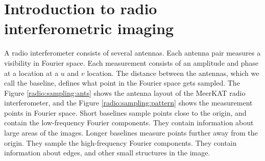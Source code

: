 \section{Introduction to radio interferometric imaging}\label{radio}

A radio interferometer consists of several antennas. Each antenna pair measures a visibility in Fourier space. Each measurement consists of an amplitude and phase at a location at a $u$ and $v$  location. The distance between the antennas, which we call the baseline, defines what point in the Fourier space gets sampled. The Figure \ref{radio:sampling:ants} shows the antenna layout of the MeerKAT radio interferometer, and the Figure \ref{radio:sampling:pattern} shows the measurement points in Fourier space. Short baselines sample points close to the origin, and contain the low-frequency Fourier components. They contain information about large areas of the images. Longer baselines measure points further away from the origin. They sample the high-frequency Fourier components. They contain information about edges, and other small structures in the image.


